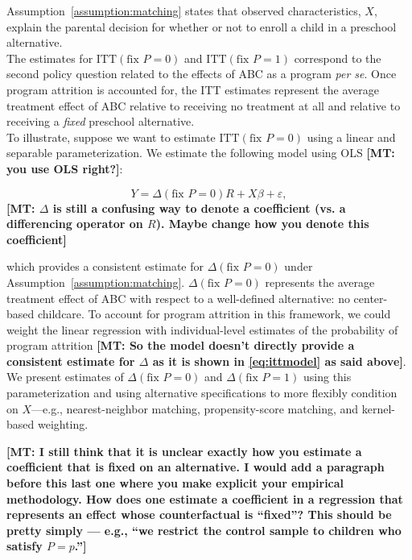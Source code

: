 \noindent Assumption~\ref{assumption:matching} states that observed characteristics, $X$, explain the parental decision for whether or not to enroll a child in a preschool alternative.\\

\noindent The estimates for $\text{ITT} \left( \text{fix } P = 0 \right) $ and $\text{ITT} \left( \text{fix } P = 1 \right)$ correspond to the second policy question related to the effects of ABC as a program \emph{per se}. Once program attrition is accounted for, the ITT estimates represent the average treatment effect of ABC relative to receiving no treatment at all and relative to receiving a \textit{fixed} preschool alternative.\\

\noindent To illustrate, suppose we want to estimate $\text{ITT} \left( \text{fix } P = 0 \right)$ using a linear and separable parameterization. We estimate the following model using OLS \textbf{[MT: you use OLS right?]}: 

\begin{equation}
Y = \Delta \left( \text{fix } P = 0 \right) R + X \beta + \varepsilon, \label{eq:ittmodel}
\end{equation}
\textbf{[MT: $\Delta$ is still a confusing way to denote a coefficient (vs. a differencing operator on $R$). Maybe change how you denote this coefficient]}

\noindent which provides a consistent estimate for $\Delta \left( \text{fix } P = 0 \right)$ under Assumption~\ref{assumption:matching}. $\Delta \left( \text{fix } P = 0 \right)$ represents the average treatment effect of ABC with respect to a well-defined alternative: no center-based childcare. To account for program attrition in this framework, we could weight the linear regression with individual-level estimates of the probability of program attrition \textbf{[MT: So the model doesn't directly provide a consistent estimate for $\Delta$ as it is shown in \eqref{eq:ittmodel} as said above]}.\\

\noindent We present estimates of $\Delta \left( \text{fix } P = 0 \right)$ and $\Delta \left( \text{fix } P = 1 \right)$ using this parameterization and using alternative specifications to more flexibly condition on $X$---e.g., nearest-neighbor matching, propensity-score matching, and kernel-based weighting.

\textbf{[MT: I still think that it is unclear exactly how you estimate a coefficient that is fixed on an alternative.  I would add a paragraph before this last one where you make explicit your empirical methodology. How does one estimate a coefficient in a regression that represents an effect whose counterfactual is ``fixed''? This should be pretty simply --- e.g., ``we restrict the control sample to children who satisfy $P=p$.'']} \\

